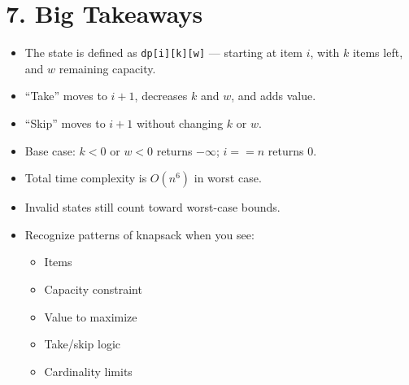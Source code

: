 \documentclass[12pt]{article}
\begin{document}
\section*{7. Big Takeaways}

\begin{itemize}
  \item The state is defined as \texttt{dp[i][k][w]} — starting at item $i$, with $k$ items left, and $w$ remaining capacity.
  \item “Take” moves to $i+1$, decreases $k$ and $w$, and adds value.
  \item “Skip” moves to $i+1$ without changing $k$ or $w$.
  \item Base case: $k < 0$ or $w < 0$ returns $-\infty$; $i == n$ returns 0.
  \item Total time complexity is $O(n^6)$ in worst case.
  \item Invalid states still count toward worst-case bounds.
  \item Recognize patterns of knapsack when you see:
    \begin{itemize}
      \item Items
      \item Capacity constraint
      \item Value to maximize
      \item Take/skip logic
      \item Cardinality limits
    \end{itemize}
\end{itemize}
\end{document}
